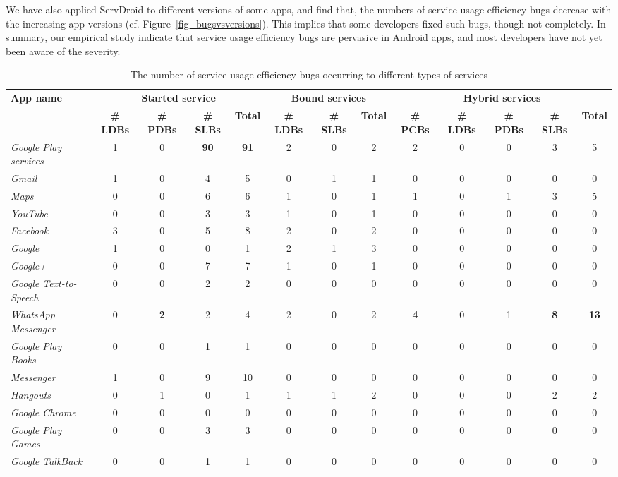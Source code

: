 \documentclass[sigconf,review, anonymous]{acmart}
\begin{document}
We have also applied \textsf{ServDroid} to different versions of some apps, and find that, the numbers of service usage efficiency bugs decrease with the increasing app versions (cf. Figure~\ref{fig_bugsvsversions}). This implies that some developers fixed such bugs, though not completely. In summary, our empirical study indicate that service usage efficiency bugs are pervasive in Android apps, and most developers have not yet been aware of the severity.

\begin{table} [htbp]
\centering
\small
\caption{The number of service usage efficiency bugs occurring to different types of services}
\begin{tabular}{|l|cccc|ccc|ccccc|}\hline
{\bf App name}&\multicolumn{4}{|c|}{\textbf{Started service}}&\multicolumn{3}{|c|}{\textbf{Bound services}}&\multicolumn{5}{|c|}{\textbf{Hybrid services}}\\
& {\bf \# LDBs}&{\bf \# PDBs} &{\bf \# SLBs}&{\bf Total}
& {\bf \# LDBs}& {\bf \# SLBs}&{\bf Total}
& {\bf \# PCBs}&{\bf \# LDBs}&{\bf \# PDBs} &{\bf \# SLBs}&{\bf Total}\\
\hline
\hline
{\it Google Play services}&1&0&{\bf 90}&{\bf 91}&2&0&2&2&0&0&3&5\\
{\it Gmail}&1&0&4&5&0&1&1&0&0&0&0&0\\
{\it Maps}&0&0&6&6&1&0&1&1&0&1&3&5\\
{\it YouTube}&0&0&3&3&1&0&1&0&0&0&0&0\\
{\it Facebook}&3&0&5&8&2&0&2&0&0&0&0&0\\
{\it Google}&1&0&0&1&2&1&3&0&0&0&0&0\\
{\it Google+}&0&0&7&7&1&0&1&0&0&0&0&0\\
{\it Google Text-to-Speech}&0&0&2&2&0&0&0&0&0&0&0&0\\
{\it WhatsApp Messenger}&0&{\bf 2}&2&4&2&0&2&{\bf 4}&0&1&{\bf 8}&{\bf 13}\\
{\it Google Play Books}&0&0&1&1&0&0&0&0&0&0&0&0\\
{\it Messenger}&1&0&9&10&0&0&0&0&0&0&0&0\\
{\it Hangouts}&0&1&0&1&1&1&2&0&0&0&2&2\\
{\it Google Chrome}&0&0&0&0&0&0&0&0&0&0&0&0\\
{\it Google Play Games}&0&0&3&3&0&0&0&0&0&0&0&0\\
{\it Google TalkBack}&0&0&1&1&0&0&0&0&0&0&0&0\\

\end{tabular}
\end{table}
\end{document}
